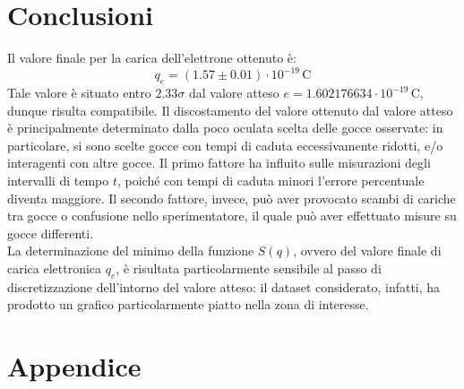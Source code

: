 \documentclass[]{article}
\let\oldsection\section%
\renewcommand{\section}{%
	\renewcommand{\theequation}{\thesection.\arabic{equation}}%
	\oldsection}%
\begin{document}
    \section{Conclusioni}
    Il valore finale per la carica dell'elettrone ottenuto è:
    \begin{equation}
        q_e = \left( 1.57 \pm 0.01 \right) \cdot 10^{-19} \, \text{C}
    \end{equation}
    Tale valore è situato entro $2.33\sigma$ dal valore atteso $e = 1.602176634 \cdot 10^{-19} \, \text{C}$, dunque risulta compatibile. Il discostamento del valore ottenuto dal valore atteso è principalmente determinato dalla poco oculata scelta delle gocce osservate: in particolare, si sono scelte gocce con tempi di caduta eccessivamente ridotti, e/o interagenti con altre gocce. Il primo fattore ha influito sulle misurazioni degli intervalli di tempo $t$, poiché con tempi di caduta minori l'errore percentuale diventa maggiore. Il secondo fattore, invece, può aver provocato scambi di cariche tra gocce o confusione nello sperimentatore, il quale può aver effettuato misure su gocce differenti. \\
    La determinazione del minimo della funzione $S(q)$, ovvero del valore finale di carica elettronica $q_e$, è risultata particolarmente sensibile al passo di discretizzazione dell'intorno del valore atteso: il dataset considerato, infatti, ha prodotto un grafico particolarmente piatto nella zona di interesse. 
    
    \newpage

    \section*{Appendice}
\end{document}
